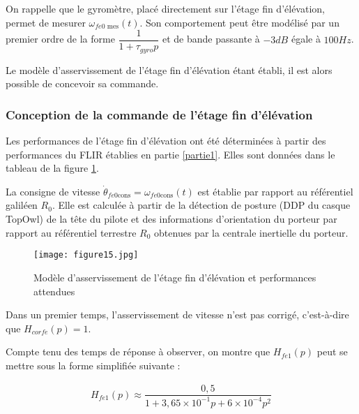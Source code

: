 On rappelle que le gyromètre, placé directement sur l'étage fin d'élévation, permet de mesurer $\omega_{fe0\text{ mes}}(t)$. Son comportement peut être modélisé par un premier ordre de la forme $\dfrac{1}{1+\tau_{gyro}p}$ et de bande passante à $-3 dB$ égale à $100 Hz$.




Le modèle d'asservissement de l'étage fin d'élévation étant établi, il est alors possible de concevoir sa commande.

\subsubsection{Conception de la commande de l'étage fin d'élévation}

Les performances de l'étage fin d'élévation ont été déterminées à partir des performances du FLIR établies en
partie \ref{partie1}. Elles sont données dans le tableau de la figure \ref{figure15}.

La consigne de vitesse $\dot{\theta}_{fe0\text{cons}}=\omega_{fe0\text{cons}}(t)$ est établie par rapport au référentiel galiléen $R_0$. Elle est calculée à partir de la détection de posture (DDP du casque TopOwl) de la tête du pilote et des informations
d'orientation du porteur par rapport au référentiel terrestre $R_0$ obtenues par la centrale inertielle du porteur.

\begin{figure}[!htb]
\begin{center}
\texttt{[image: figure15.jpg]}
\caption{Modèle d'asservissement de l'étage fin d'élévation et performances attendues \label{figure15}}
\end{center}
\end{figure}

Dans un premier temps, l'asservissement de vitesse n'est pas corrigé, c'est-à-dire que $H_{corfe}(p)=1$.


Compte tenu des temps de réponse à observer, on montre que $H_{fe1}(p)$ peut se mettre sous la forme simplifiée
suivante :

\begin{align*}
H_{fe1}(p)\approx\dfrac{0,5}{1+3,65\times 10^{-1}p+6\times 10^{-4}p^2}
\end{align*}


